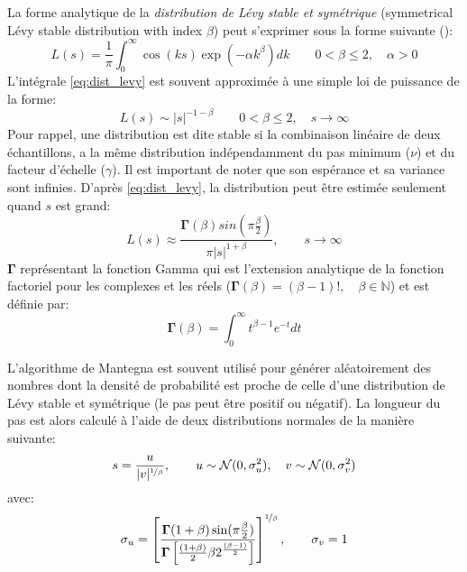 La forme analytique de la \emph{distribution de Lévy stable et symétrique} (symmetrical Lévy stable distribution with index $\beta$) peut
s’exprimer sous la forme suivante (\cite{Gutowski2001}):
\begin{equation}\label{eq:dist_levy}
    L(s) = \frac{1}{\pi} \int_{0}^{\infty} \cos(k s)\exp(-\alpha k^{\beta}) dk \qquad  0 < \beta \leq 2, \quad \alpha > 0
\end{equation}
L’intégrale \eqref{eq:dist_levy} est souvent approximée à une simple loi de puissance de la forme:
\begin{equation}\label{eq:power_levy}
    L(s) \sim \mathopen{|}s\mathclose{|}^{-1-\beta} \qquad  0 < \beta \leq 2, \quad s \to \infty
\end{equation}
Pour rappel, une distribution est dite stable si la
combinaison linéaire de deux échantillons, a la même distribution indépendamment du pas minimum ($\nu$) et du facteur
d’échelle ($\gamma$).
Il est important de noter que son espérance et sa variance sont infinies.
D’après \eqref{eq:dist_levy}, la distribution peut être estimée seulement quand $s$ est grand:
\begin{equation}
    L(s) \approx \frac{\mathbf{\Gamma}(\beta)sin(\pi\frac{\beta}{2})}{\pi\mathopen{|}s\mathclose{|}^{1+\beta}}, \qquad s \to \infty
\end{equation}
$\mathbf{\Gamma}$ représentant la fonction Gamma qui est l’extension analytique de la fonction factoriel pour
les complexes et les réels ($\mathbf{\Gamma}(\beta) = (\beta -1)!, \quad \beta\in \mathbb{N}$) et est définie par:
\begin{equation}
    \mathbf{\Gamma}(\beta) = \int_{0}^{\infty} t^{\beta-1}e^{-t} dt
\end{equation}

L’algorithme de Mantegna \cite{Mantegna19944677} est souvent utilisé pour générer aléatoirement des nombres
dont la densité de probabilité est proche de celle d’une distribution de Lévy stable et symétrique (le pas peut
être positif ou négatif).
La longueur du pas est alors calculé à l’aide de deux distributions normales de la manière suivante:
\begin{equation}\label{eq:step_len}
    s = \frac{u}{\mathopen{|}v\mathclose{|}^{\nicefrac{1}{\beta}}}, \qquad u \sim \mathcal{N}(0, \sigma_{u}^{2}), \quad v \sim \mathcal{N}(0, \sigma_{v}^{2})
\end{equation}
avec:
\begin{equation}\label{eq:sigmas}
    \sigma_{u} = \left[ \frac{\mathbf{\Gamma}(1+\beta)\sin(\pi\frac{\beta}{2})}%
                             {\mathbf{\Gamma} \left[\frac{(1+\beta)}{2}\beta 2^{\frac{(\beta-1)}{2}}\right]}\right]^{\nicefrac{1}{\beta}},%
    \qquad \sigma_{v} = 1
\end{equation}

